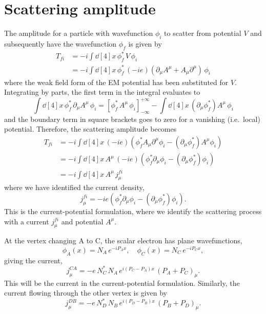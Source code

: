 \section{Scattering amplitude}
The amplitude for a particle with wavefunction $\phi_i$ to scatter from potential $V$ and subsequently have the wavefunction $\phi_f$ is given by
\begin{align}
T_{fi} &= -i \int \dd[4]{x} \, \phi_f^* \, V \, \phi_i \\
&= -i \int \dd[4]{x} \, \phi_f^* \, (-ie) \left( \partial_\mu A^\mu + A_\mu\partial^\mu \right) \, \phi_i
\end{align}
where the weak field form of the EM potential has been substituted for $V$. Integrating by parts, the first term in the integral evaluates to
\begin{equation}
\int \dd[4]{x} \, \phi_f^* \, \partial_\mu A^\mu \, \phi_i = \left[ \phi_f^* \, A^\mu \, \phi_i \right]_{-\infty}^{+\infty} - \int \dd[4]{x} \, \left( \partial_\mu \phi_f^* \right) A^\mu \, \phi_i
\end{equation}
and the boundary term in square brackets goes to zero for a vanishing (i.e.~local) potential. Therefore, the scattering amplitude becomes
\begin{align}
T_{fi} &= -i \int \dd[4]{x} \,(-ie)\left( \phi_f^* A_\mu \partial^\mu \phi_i - (\partial_\mu \phi_f^*) A^\mu \phi_i \right) \nonumber \\
&= -i \int \dd[4]{x} \, A^\mu \,(-ie)\left( \phi_f^* \partial_\mu \phi_i - (\partial_\mu \phi_f^*) \phi_i \right) \nonumber \\
&= -i \int \dd[4]{x} \, A^\mu \, j_\mu^{fi} \label{eq:scatterAmp}
\end{align}
where we have identified the current density,
\begin{equation}
j_\mu^{fi} = -ie \left( \phi_f^* \partial_\mu \phi_i - (\partial_\mu \phi_f^*) \phi_i \right).
\end{equation}
This is the current-potential formulation, where we identify the scattering process with a current $j_\mu^{fi}$ and potential $A^\mu$.

At the vertex changing A to C, the scalar electron has plane wavefunctions,
\begin{equation}
\phi_A(x) = N_A \, e^{-iP_Ax}, \quad \phi_C(x) = N_C \, e^{-iP_Cx},
\end{equation}
giving the current,
\begin{equation}
j_\mu^{CA} = -e \, N_C^* \, N_A \, e^{i(P_C-P_A)x} \, (P_A + P_C)_\mu. \label{eq:current}
\end{equation}
This will be the current in the current-potential formulation. Similarly, the current flowing through the other vertex is given by
\begin{equation}
j_\mu^{DB} = -e \, N_D^* \, N_B \, e^{i(P_D-P_B)x} \, (P_B + P_D)_\mu.
\end{equation}

